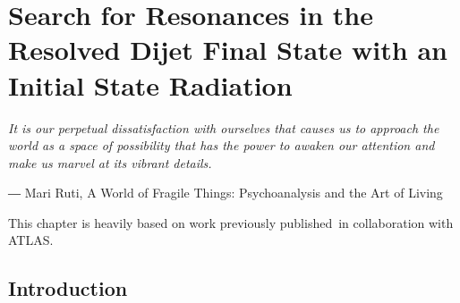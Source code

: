 \chapter{Search for Resonances in the Resolved Dijet Final State with an Initial State Radiation}
\label{chapter:dijetISR}


\epigraph{\textit{It is our perpetual dissatisfaction with ourselves that causes us to approach the world as a space of possibility that has the power to awaken our attention and make us marvel at its vibrant details.}}{
― Mari Ruti, A World of Fragile Things: Psychoanalysis and the Art of Living}


This chapter is heavily based on work previously published~\cite{dijetISR2019}in collaboration with ATLAS.

\section{Introduction}

\newcommand{\pt}{\ensuremath{p_{\text{T}}}\xspace}
\newcommand{\MGMCatNLOV}[1]{\textsc{MadGraph5}\_aMC@NLO~#1\xspace}
\newcommand{\PYTHIA}{\textsc{Pythia}\xspace}

\newcommand{\ifb}{\ensuremath(ifb)}
\newcommand{\ptmin}{\ensuremath{\pt^{\textrm{min}}}\xspace}
\newcommand{\nphoton}{\ensuremath{n_{\gamma}}\xspace}
\newcommand{\photonPt}{\ensuremath{E_{\textrm{T}}^{\gamma}}\xspace}
\newcommand{\jetPt}{\ensuremath{p_{\textrm{T}}^{\textrm{jet}}}\xspace}
\newcommand{\ntag}{\ensuremath{n_{\textrm{$b$-tag}}}\xspace}
\newcommand{\mjj}{\ensuremath{m_{\textrm{jj}}}\xspace}
\newcommand{\yStar}{\ensuremath{y^{\ast}}\xspace}
\newcommand{\jetEta}{\ensuremath{\eta^{\textrm{jet}}}\xspace}

\newcommand{\photonPtTrig}{\ensuremath{E_{\textrm{T, trig}}^{\gamma}}\xspace}
\newcommand{\photonEta}{\ensuremath{\eta^{\gamma}}\xspace}
\newcommand{\photonY}{\ensuremath{y^{\gamma}}\xspace}
\newcommand{\photonPhi}{\ensuremath{\phi^{\gamma}}\xspace}
\newcommand{\jetEt}{\ensuremath{E_{\textrm{T}}^{\textrm{jet}}}\xspace}

